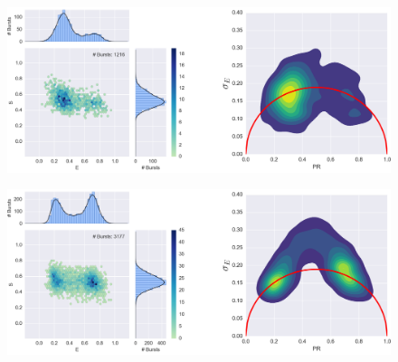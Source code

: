 



\begin{figure}
\begin{center}
\includegraphics[width=\doublefig]{"figures/20dA_20dT_200mMMgcl_ALEX_BVA5/20dA_20dT_200mMMgcl_ALEX_BVA5"}
\caption[]{}
\end{center}
\end{figure}

\begin{figure}
\begin{center}
\includegraphics[width=\doublefig]{"figures/HP3_RT_400mM_NaCl_ALEX_BVA2/HP3_RT_400mM_NaCl_ALEX_BVA2"}
\caption[]{}
\end{center}
\end{figure}








